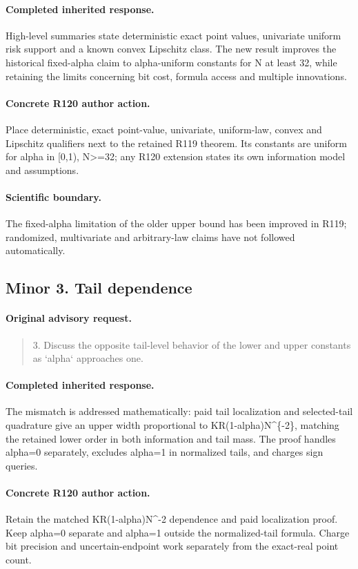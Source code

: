 \paragraph{Completed inherited response.}
High-level summaries state deterministic exact point values, univariate uniform risk support and a known convex Lipschitz class. The new result improves the historical fixed-alpha claim to alpha-uniform constants for N at least 32, while retaining the limits concerning bit cost, formula access and multiple innovations.
\paragraph{Concrete R120 author action.}
Place deterministic, exact point-value, univariate, uniform-law, convex and Lipschitz qualifiers next to the retained R119 theorem. Its constants are uniform for alpha in [0,1), N>=32; any R120 extension states its own information model and assumptions.
\paragraph{Scientific boundary.}
The fixed-alpha limitation of the older upper bound has been improved in R119; randomized, multivariate and arbitrary-law claims have not followed automatically.

\subsection{Minor 3. Tail dependence}
\label{response120:minor-3}
\paragraph{Original advisory request.}
\begin{quote}
3. Discuss the opposite tail-level behavior of the lower and upper constants as `alpha` approaches one.
\end{quote}
\paragraph{Completed inherited response.}
The mismatch is addressed mathematically: paid tail localization and selected-tail quadrature give an upper width proportional to KR(1-alpha)N\textasciicircum{}\{-2\}, matching the retained lower order in both information and tail mass. The proof handles alpha=0 separately, excludes alpha=1 in normalized tails, and charges sign queries.
\paragraph{Concrete R120 author action.}
Retain the matched KR(1-alpha)N\textasciicircum{}-2 dependence and paid localization proof. Keep alpha=0 separate and alpha=1 outside the normalized-tail formula. Charge bit precision and uncertain-endpoint work separately from the exact-real point count.
